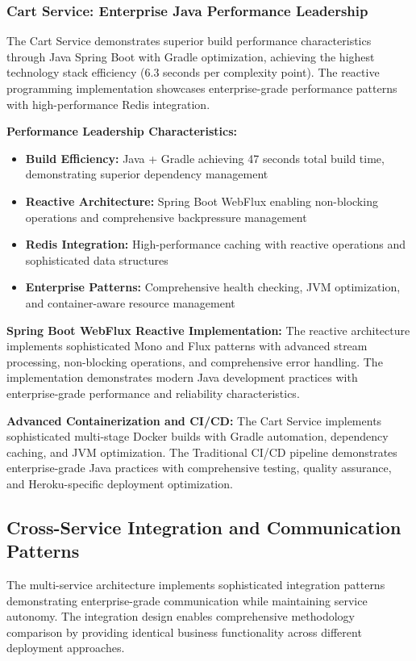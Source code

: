 \subsubsection{Cart Service: Enterprise Java Performance Leadership}

The Cart Service demonstrates superior build performance characteristics through Java Spring Boot with Gradle optimization, achieving the highest technology stack efficiency (6.3 seconds per complexity point). The reactive programming implementation showcases enterprise-grade performance patterns with high-performance Redis integration.

\textbf{Performance Leadership Characteristics:}
\begin{itemize}
\item \textbf{Build Efficiency:} Java + Gradle achieving 47 seconds total build time, demonstrating superior dependency management
\item \textbf{Reactive Architecture:} Spring Boot WebFlux enabling non-blocking operations and comprehensive backpressure management
\item \textbf{Redis Integration:} High-performance caching with reactive operations and sophisticated data structures
\item \textbf{Enterprise Patterns:} Comprehensive health checking, JVM optimization, and container-aware resource management
\end{itemize}

\textbf{Spring Boot WebFlux Reactive Implementation:}
The reactive architecture implements sophisticated Mono and Flux patterns with advanced stream processing, non-blocking operations, and comprehensive error handling. The implementation demonstrates modern Java development practices with enterprise-grade performance and reliability characteristics.

\textbf{Advanced Containerization and CI/CD:}
The Cart Service implements sophisticated multi-stage Docker builds with Gradle automation, dependency caching, and JVM optimization. The Traditional CI/CD pipeline demonstrates enterprise-grade Java practices with comprehensive testing, quality assurance, and Heroku-specific deployment optimization.

\subsection{Cross-Service Integration and Communication Patterns}

The multi-service architecture implements sophisticated integration patterns demonstrating enterprise-grade communication while maintaining service autonomy. The integration design enables comprehensive methodology comparison by providing identical business functionality across different deployment approaches.

